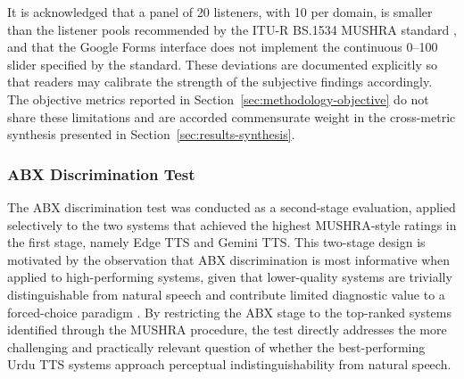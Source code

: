 \documentclass[a4paper,fleqn]{cas-dc}
\begin{document}
\begin{sloppypar}
    It is acknowledged that a panel of 20 listeners, with 10 per domain,
    is smaller than the listener pools recommended by the ITU-R BS.1534
    MUSHRA standard \citep{itu2015mushra}, and that the Google Forms
    interface does not implement the continuous 0--100 slider specified
    by the standard. These deviations are documented explicitly so that
    readers may calibrate the strength of the subjective findings
    accordingly. The objective metrics reported in
    Section~\ref{sec:methodology-objective} do not share these
    limitations and are accorded commensurate weight in the cross-metric
    synthesis presented in Section~\ref{sec:results-synthesis}.
    \end{sloppypar}
    
    \subsubsection{ABX Discrimination Test}\label{sec:methodology-abx}
    
    The ABX discrimination test was conducted as a second-stage evaluation,
    applied selectively to the two systems that achieved the highest
    MUSHRA-style ratings in the first stage, namely Edge TTS and Gemini TTS.
    This two-stage design is motivated by the observation that ABX
    discrimination is most informative when applied to high-performing
    systems, given that lower-quality systems are trivially distinguishable
    from natural speech and contribute limited diagnostic value to a
    forced-choice paradigm \citep{schatz2013abx}. By restricting the ABX
    stage to the top-ranked systems identified through the MUSHRA procedure,
    the test directly addresses the more challenging and practically relevant
    question of whether the best-performing Urdu TTS systems approach
    perceptual indistinguishability from natural speech.
    
\end{document}
